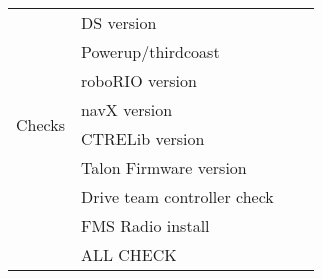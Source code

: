 \documentclass{article}
\begin{document}
\begin{tabular}{l|l|l|l}
\multirow{8}{*}{Checks}     &  DS version &\\ \cline{2-3}
&  Powerup/thirdcoast &\\ \cline{2-3}
& roboRIO version & \\ \cline{2-3}
& navX version & \\ \cline{2-3}
& CTRELib version & \\ \cline{2-3}
& Talon Firmware version & \\ \cline{2-3}
& Drive team controller check & \\ \cline{2-3}
& FMS Radio install & \\ \hline \hline \hline

& ALL CHECK     &  \\ \cline{2-3}

\end{tabular}
\end{document}
